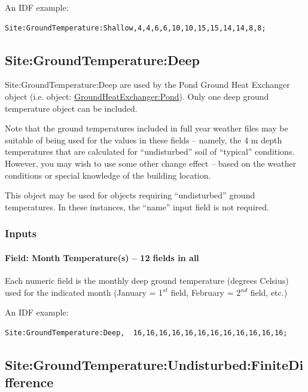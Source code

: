 An IDF example:

\begin{lstlisting}
Site:GroundTemperature:Shallow,4,4,6,6,10,10,15,15,14,14,8,8;
\end{lstlisting}

\subsection{Site:GroundTemperature:Deep}\label{sitegroundtemperaturedeep}

Site:GroundTemperature:Deep are used by the Pond Ground Heat Exchanger object (i.e. object: \hyperref[groundheatexchangerpond]{GroundHeatExchanger:Pond}). Only one deep ground temperature object can be included.

\begin{callout}
Note that the ground temperatures included in full year weather files may be suitable of being used for the values in these fields -- namely, the 4 m depth temperatures that are calculated for ``undisturbed'' soil of ``typical'' conditions. However, you may wish to use some other change effect -- based on the weather conditions or special knowledge of the building location.
\end{callout}

This object may be used for objects requiring ``undisturbed'' ground temperatures. In these instances, the ``name'' input field is not required.

\subsubsection{Inputs}\label{inputs-13-007}

\paragraph{Field: Month Temperature(s) -- 12 fields in all}\label{field-month-temperatures-12-fields-in-all-2}

Each numeric field is the monthly deep ground temperature (degrees Celsius) used for the indicated month (January = 1\(^{st}\) field, February = 2\(^{nd}\) field, etc.)

An IDF example:

\begin{lstlisting}
Site:GroundTemperature:Deep,  16,16,16,16,16,16,16,16,16,16,16,16;
\end{lstlisting}

\subsection{Site:GroundTemperature:Undisturbed:FiniteDifference}\label{sitegroundtemperatureundisturbedfinitedifference}

